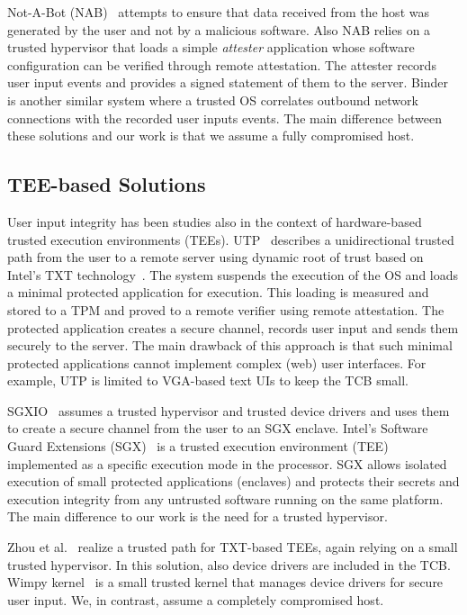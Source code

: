Not-A-Bot (NAB)~\cite{nab} attempts to ensure that data received from the host was generated by the user and not by a malicious software. Also NAB relies on a trusted hypervisor that loads a simple \emph{attester} application whose software configuration can be verified through remote attestation. The attester records user input events and provides a signed statement of them to the server. Binder~\cite{binder} is another similar system where a trusted OS correlates outbound network connections with the recorded user inputs events. The main difference between these solutions and our work is that we assume a fully compromised host.


\subsection{TEE-based Solutions} 

User input integrity has been studies also in the context of hardware-based trusted execution environments (TEEs).  UTP~\cite{utp} describes a unidirectional trusted path from the user to a remote server using dynamic root of trust based on Intel's TXT technology~\cite{mccune2008flicker}. The system suspends the execution of the OS and loads a minimal protected application for execution. This loading is measured and stored to a TPM and proved to a remote verifier using remote attestation. The protected application creates a secure channel, records user input and sends them securely to the server. The main drawback of this approach is that such minimal protected applications cannot implement complex (web) user interfaces. For example, UTP is limited to VGA-based text UIs to keep the TCB small.

SGXIO~\cite{sgxio} assumes a trusted hypervisor and trusted device drivers and uses them to create a secure channel from the user to an SGX enclave. Intel's Software Guard Extensions (SGX)~\cite{sgx} is a trusted execution environment (TEE) implemented as a specific execution mode in the processor. SGX allows isolated execution of small protected applications (enclaves) and protects their secrets and execution integrity from any untrusted software running on the same platform. The main difference to our work is the need for a trusted hypervisor.

Zhou et al.~\cite{x86} realize a trusted path for TXT-based TEEs, again relying on a small trusted hypervisor. In this solution, also device drivers are included in the TCB. Wimpy kernel~\cite{wimpyKernel} is a small trusted kernel that manages device drivers for secure user input. We, in contrast, assume a completely compromised host.



